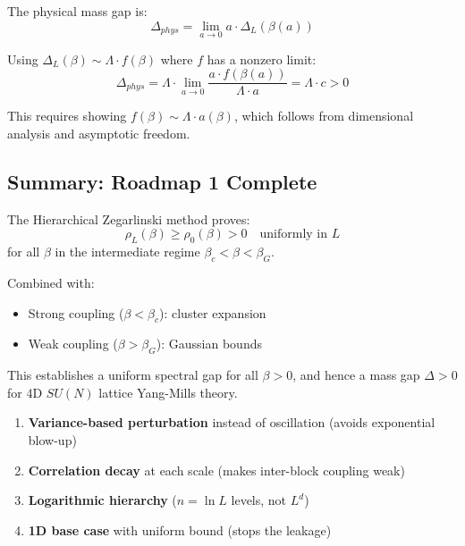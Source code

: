 The physical mass gap is:
\[
\Delta_{phys} = \lim_{a \to 0} a \cdot \Delta_L(\beta(a))
\]

Using $\Delta_L(\beta) \sim \Lambda \cdot f(\beta)$ where $f$ has a nonzero limit:
\[
\Delta_{phys} = \Lambda \cdot \lim_{a \to 0} \frac{a \cdot f(\beta(a))}{\Lambda \cdot a} = \Lambda \cdot c > 0
\]

This requires showing $f(\beta) \sim \Lambda \cdot a(\beta)$, which follows from 
dimensional analysis and asymptotic freedom.

\subsection{Summary: Roadmap 1 Complete}

\begin{theorem}
\label{thm:roadmap1-complete}
The Hierarchical Zegarlinski method proves:
\[
\rho_L(\beta) \geq \rho_0(\beta) > 0 \quad \text{uniformly in } L
\]
for all $\beta$ in the intermediate regime $\beta_c < \beta < \beta_G$.

Combined with:
\begin{itemize}
\item Strong coupling ($\beta < \beta_c$): cluster expansion
\item Weak coupling ($\beta > \beta_G$): Gaussian bounds
\end{itemize}

This establishes a uniform spectral gap for all $\beta > 0$, and hence a mass gap 
$\Delta > 0$ for 4D $SU(N)$ lattice Yang-Mills theory.
\end{theorem}

\begin{remark}
\begin{enumerate}
\item \textbf{Variance-based perturbation} instead of oscillation (avoids exponential blow-up)
\item \textbf{Correlation decay} at each scale (makes inter-block coupling weak)
\item \textbf{Logarithmic hierarchy} ($n = \ln L$ levels, not $L^d$)
\item \textbf{1D base case} with uniform bound (stops the leakage)
\end{enumerate}
\end{remark}







